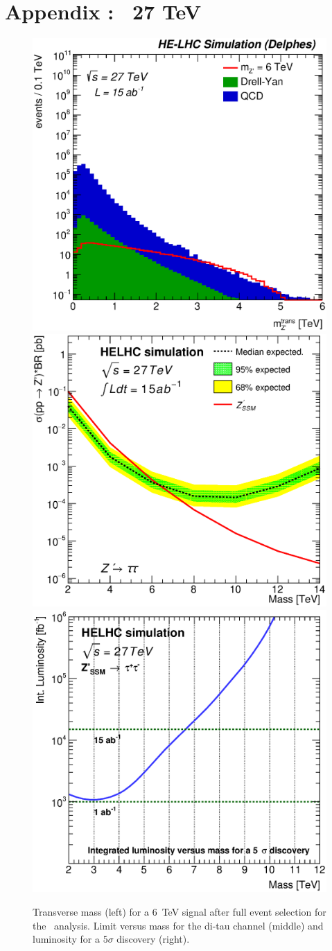 \clearpage
\newpage

\section{Appendix :  \texorpdfstring{\Zptata}{zptata}\  27 TeV}
\label{appendix:zptautau27}

\begin{figure}[!htb]
  \centering
  \includegraphics[width=0.32\columnwidth]{Fig/27tev/Zptautau_mt_sel0_nostack_log.eps}
  \includegraphics[width=0.32\columnwidth]{Fig/27tev/lim_Zprime_tautau_helhc_v01.eps}
  \includegraphics[width=0.32\columnwidth]{Fig/27tev/DiscoveryPotential_tautau_rootStyle.eps}
  \caption{Transverse mass (left) for a 6~TeV signal after full event selection for the \Zptata\ analysis. Limit versus mass for the di-tau channel (middle) and luminosity for a $5\sigma$ discovery (right).}
  \label{figure:leptonicresonances27:tautau}
\end{figure}

